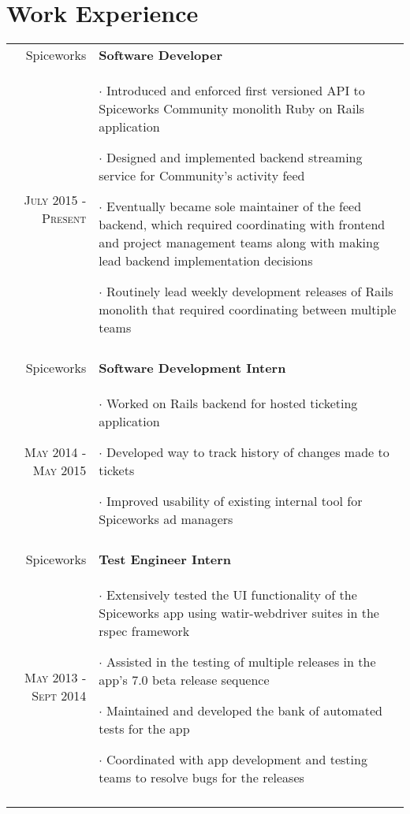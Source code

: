 \documentclass[a4paper,10pt]{article}
\begin{document}
\section{Work Experience}
\begin{tabular}{r|p{11cm}}
  Spiceworks & \textbf{Software Developer} \\
  \textsc{July 2015 - Present} &
    \footnotesize{
      $\cdot$ Introduced and enforced first versioned API to Spiceworks Community monolith Ruby on Rails application

      $\cdot$ Designed and implemented backend streaming service for
      Community's activity feed

      $\cdot$ Eventually became sole maintainer of the feed backend, which required coordinating with frontend and project management teams along with making lead backend implementation decisions

      $\cdot$ Routinely lead weekly development releases of Rails monolith
      that required coordinating between multiple teams
    }
  \\\multicolumn{2}{c}{} \\

  Spiceworks & \textbf{Software Development Intern} \\
  \textsc{May 2014 - May 2015} &
    \footnotesize{
      $\cdot$ Worked on Rails backend for hosted ticketing application

      $\cdot$ Developed way to track history of changes made to tickets

      $\cdot$ Improved usability of existing internal tool for Spiceworks ad managers
    }
  \\\multicolumn{2}{c}{} \\

  Spiceworks & \textbf{Test Engineer Intern} \\
  \textsc{May 2013 - Sept 2014} &
    \footnotesize{
      $\cdot$ Extensively tested the UI functionality of the Spiceworks
      app using watir-webdriver suites in the rspec framework

      $\cdot$ Assisted in the testing of multiple releases in the app’s
      7.0 beta release sequence

      $\cdot$ Maintained and developed the bank of automated tests for the
      app

      $\cdot$ Coordinated with app development and testing teams to
      resolve bugs for the releases
    }
  \\\multicolumn{2}{c}{} \\

\end{tabular}
\end{document}
